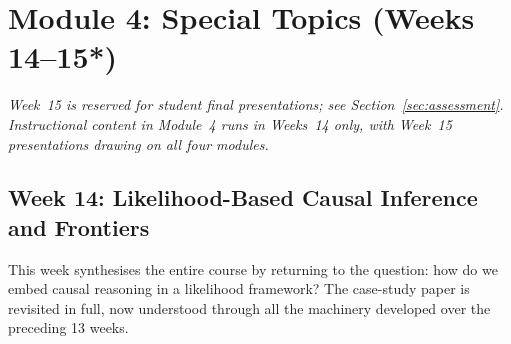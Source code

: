 \documentclass[12pt]{article}
\begin{document}
\section{Module 4: Special Topics (Weeks 14--15*)}

\emph{Week~15 is reserved for student final presentations;
see Section~\ref{sec:assessment}.  Instructional content in Module~4
runs in Weeks~14 only, with Week~15 presentations drawing on all four
modules.}

\subsection{Week 14: Likelihood-Based Causal Inference and Frontiers}

This week synthesises the entire course by returning to the question:
how do we embed causal reasoning in a likelihood framework?  The
case-study paper is revisited in full, now understood through all the
machinery developed over the preceding 13 weeks.
\end{document}
